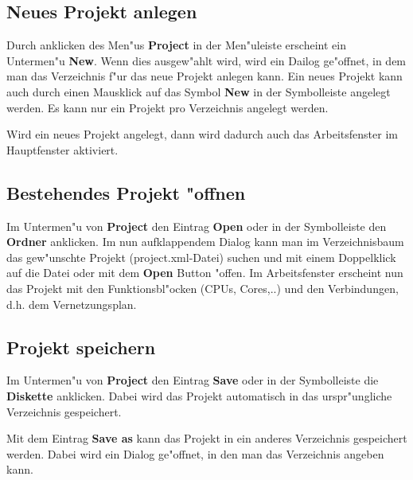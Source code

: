 \documentclass[a4paper,titlepage,12pt,ngerman]{scrbook}
\begin{document}
\subsection{Neues Projekt anlegen}
Durch anklicken des Men"us {\bf Project} in der Men"uleiste erscheint ein Untermen"u {\bf New}. Wenn dies ausgew"ahlt wird, wird ein Dailog ge"offnet, in dem man das Verzeichnis f"ur das neue Projekt anlegen kann.\newline
Ein neues Projekt kann auch durch einen Mausklick auf das Symbol {\bf New} in der Symbolleiste angelegt werden.\newline
Es kann nur ein Projekt pro Verzeichnis angelegt werden.\par
Wird ein neues Projekt angelegt, dann wird dadurch auch das Arbeitsfenster im Hauptfenster aktiviert.


\subsection{Bestehendes Projekt "offnen}
Im Untermen"u von {\bf Project} den Eintrag {\bf Open} oder in der Symbolleiste den {\bf Ordner} anklicken. Im nun aufklappendem Dialog kann man im Verzeichnisbaum das gew"unschte Projekt (project.xml-Datei) suchen und mit einem Doppelklick auf die Datei oder mit dem {\bf Open} Button "offen.
Im Arbeitsfenster erscheint nun das Projekt mit den Funktionsbl"ocken (CPUs, Cores,..) und den Verbindungen, d.h. dem Vernetzungsplan.\par


\subsection{Projekt speichern}
Im Untermen"u von {\bf Project} den Eintrag {\bf Save} oder in der Symbolleiste die {\bf Diskette} anklicken. Dabei wird das Projekt automatisch in das urspr"ungliche Verzeichnis gespeichert.\par
Mit dem Eintrag {\bf Save as} kann das Projekt in ein anderes Verzeichnis gespeichert werden. Dabei wird ein Dialog ge"offnet, in den man das Verzeichnis angeben kann.\par


\end{document}
